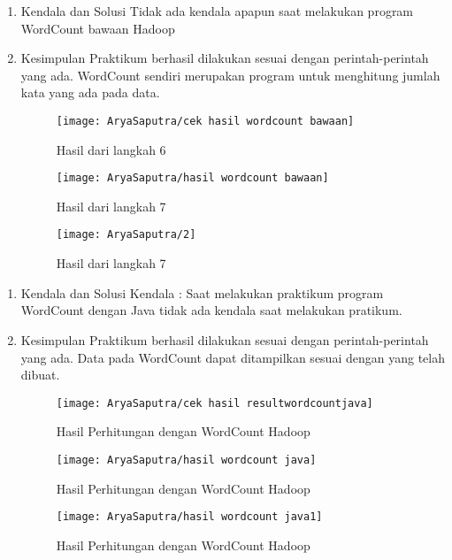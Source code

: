 \begin{enumerate}
\item Kendala dan Solusi
\newline Tidak ada kendala apapun saat melakukan program WordCount bawaan Hadoop

\item Kesimpulan
\newline Praktikum berhasil dilakukan sesuai dengan perintah-perintah yang ada. WordCount sendiri merupakan program untuk menghitung jumlah kata yang ada pada data.

\begin{figure}[!ht]
\texttt{[image: AryaSaputra/cek hasil wordcount bawaan]}
\caption{Hasil dari langkah 6}
\label{gam:wordcount bawaan}
\end{figure}

\begin{figure}[!ht]
\texttt{[image: AryaSaputra/hasil wordcount bawaan]}
\caption{Hasil dari langkah 7}
\label{gam:wordcount bawaan}
\end{figure}

\vspace*{-1cm}
\begin{figure}[!ht]
\texttt{[image: AryaSaputra/2]}
\caption{Hasil dari langkah 7}
\label{gam:wordcount bawaan}
\end{figure}
\end{enumerate}

\clearpage
{}
\begin{enumerate}
\item Kendala dan Solusi
\newline Kendala :
Saat melakukan praktikum program WordCount dengan Java tidak ada kendala saat melakukan pratikum.

\item Kesimpulan
\newline Praktikum berhasil dilakukan sesuai dengan perintah-perintah yang ada. Data pada WordCount dapat ditampilkan sesuai dengan yang telah dibuat.


\begin{figure}[!ht]
\texttt{[image: AryaSaputra/cek hasil resultwordcountjava]}
\caption{Hasil Perhitungan dengan WordCount Hadoop}
\label{gam:result wordcount java}
\end{figure}

\vspace*{-1cm}
\begin{figure}[!ht]
\texttt{[image: AryaSaputra/hasil wordcount java]}
\caption{Hasil Perhitungan dengan WordCount Hadoop}
\label{gam:result wordcount java}
\end{figure}

\vspace*{-.5cm}
\begin{figure}[!ht]
\texttt{[image: AryaSaputra/hasil wordcount java1]}
\caption{Hasil Perhitungan dengan WordCount Hadoop}
\label{gam:result wordcount java}
\end{figure}
\end{enumerate}


